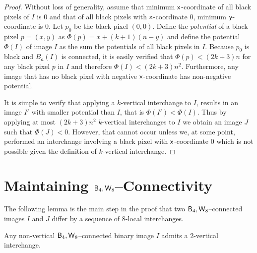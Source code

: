 \documentclass[lotsofwhite,charterfonts]{patmorin}
\newcommand{\foureight}{\ensuremath{\protect\textup{\textsf{B}}_{4},\protect\textup{\textsf{W}}_{8}}}
\newcommand{\x}{\ensuremath{\protect\textup{\textsf{x}}}}
\newcommand{\y}{\ensuremath{\protect\textup{\textsf{y}}}}
\begin{document}
\begin{proof} 

Without loss of generality, assume that minimum \x-coordinate of
all black pixels of $I$ is 0 and that of all black pixels with
\x-coordinate 0, minimum \y-coordinate is 0.  Let $p_0$ be the
black pixel $(0,0)$. Define the \emph{potential} of a black pixel
$p=(x,y)$ as $\Phi(p)=x +(k+1)(n-y)$ and define the potential $\Phi(I)$ of
image $I$ as the sum the potentials of all black pixels in $I$.
Because $p_0$ is black and $B_a(I)$ is connected, it is easily
verified that $\Phi(p)< (2k+3)n$ for any black pixel $p$ in $I$ and therefore
$\Phi(I)< (2k+3)n^2$. Furthermore, any image that has no black pixel with negative \x-coordinate has non-negative potential.

It is simple to verify that applying a $k$-vertical interchange to $I$, results in an image $I'$ with smaller potential than $I$, that is $\Phi(I')<\Phi(I)$. Thus by applying at most $(2k+3)n^2$ $k$-vertical interchanges to $I$ we obtain an image $J$ such that $\Phi(J)< 0$. However, that cannot occur unless we, at some point, performed an interchange involving a black pixel with \x-coordinate $0$ which is not possible given the definition of $k$-vertical interchange.
\end{proof}



\section{Maintaining $\foureight$--Connectivity}


The following lemma is the main step in the proof that two
\foureight--connected images $I$ and $J$ differ by a sequence of
$8$-local interchanges.  

\begin{lem}
Any non-vertical $\foureight$--connected binary image $I$ admits a $2$-vertical interchange.
\end{lem}
\end{document}
